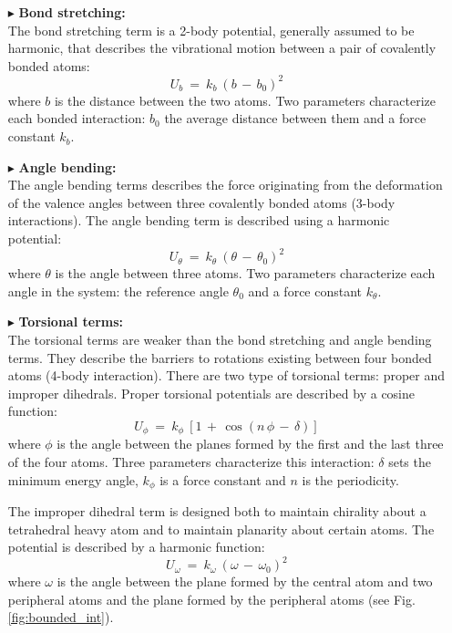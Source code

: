 \begin{itemize}
\item[$\blacktriangleright$] \textbf{Bond stretching:}\\
The bond stretching term is a 2-body potential, generally assumed to be harmonic, that describes the vibrational motion between a pair of covalently bonded atoms:
\begin{equation}\label{eq:poten-bond_int}
U_b \: = \: k_b \: (b \,-\, b_0)^2
\end{equation}
where $b$ is the distance between the two atoms. Two parameters characterize each bonded interaction: $b_0$ the average distance between them and a force constant $k_b$.

\item[$\blacktriangleright$] \textbf{Angle bending:}\\
The angle bending terms describes the force originating from the deformation of the valence angles between three covalently bonded atoms (3-body interactions). The angle bending term is described using a harmonic potential:
\begin{equation}\label{eq:poten-angle_int}
U_\theta \: = \: k_\theta \: (\theta \,-\, \theta_0)^2
\end{equation}
where $\theta$ is the angle between three atoms. Two parameters characterize each angle in the system: the reference angle $\theta_0$ and a force constant $k_\theta$. \\

\item[$\blacktriangleright$] \textbf{Torsional terms:}\\
The torsional terms are weaker than the bond stretching and angle bending terms. They describe the barriers to rotations existing between four bonded atoms (4-body interaction). There are two type of torsional terms: proper and improper dihedrals. Proper torsional potentials are described by a cosine function:
\begin{equation}\label{eq:poten-dihedral_int}
U_\phi \: = \: k_\phi \: [1 \, + \, \cos (n \, \phi \,-\, \delta)]
\end{equation}
where $\phi$ is the angle between the planes formed by the first and the last three of the four atoms. Three parameters characterize this interaction: $\delta$ sets the minimum energy angle, $k_\phi$ is a force constant and $n$ is the periodicity.

The improper dihedral term is designed both to maintain chirality about a tetrahedral heavy atom and to maintain planarity about certain atoms. The potential is described by a harmonic function:
\begin{equation}\label{eq:poten-imp_dihedral_int}
U_\omega \: = \: k_\omega \: (\omega \,-\, \omega_0)^2
\end{equation}
where $\omega$ is the angle between the plane formed by the central atom and two peripheral atoms and the plane formed by the peripheral atoms (see Fig. \ref{fig:bounded_int}).
\end{itemize}

